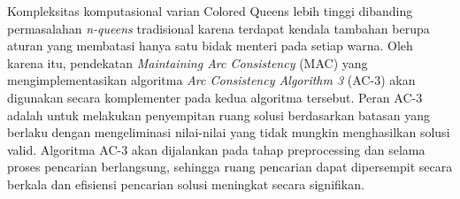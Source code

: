 \documentclass[a4paper,twoside]{article}
\begin{document}
	Kompleksitas komputasional varian Colored Queens lebih tinggi dibanding permasalahan \textit{n-queens} tradisional karena terdapat kendala tambahan berupa aturan yang membatasi hanya satu bidak menteri pada setiap warna. Oleh karena itu, pendekatan \textit{Maintaining Arc Consistency} (MAC) yang mengimplementasikan algoritma \textit{Arc Consistency Algorithm 3} (AC-3) akan digunakan secara komplementer pada kedua algoritma tersebut. Peran AC-3 adalah untuk melakukan penyempitan ruang solusi berdasarkan batasan yang berlaku dengan mengeliminasi nilai-nilai yang tidak mungkin menghasilkan solusi valid. Algoritma AC-3 akan dijalankan pada tahap preprocessing dan selama proses pencarian berlangsung, sehingga ruang pencarian dapat dipersempit secara berkala dan efisiensi pencarian solusi meningkat secara signifikan.
	
\end{document}
